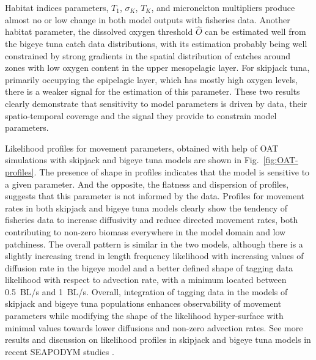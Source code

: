 Habitat indices parameters, $T_1$, $\sigma_K$, $T_K$, and micronekton multipliers produce almost no or low change in both model outputs with fisheries data. Another habitat parameter, the dissolved oxygen threshold $\hat{O}$ can be estimated well from the bigeye tuna catch data distributions, with its estimation probably being well constrained by strong gradients in the spatial distribution of catches around zones with low oxygen content in the upper mesopelagic layer. For skipjack tuna, primarily occupying the epipelagic layer, which has mostly high oxygen levels, there is a weaker signal for the estimation of this parameter. These two results clearly demonstrate that sensitivity to model parameters is driven by data, their spatio-temporal coverage and the signal they provide to constrain model parameters.

Likelihood profiles for movement parameters, obtained with help of OAT simulations with skipjack and bigeye tuna models are shown in Fig.~\ref{fig:OAT-profiles}. The presence of shape in profiles indicates that the model is sensitive to a given parameter. And the opposite, the flatness and dispersion of profiles, suggests that this parameter is not informed by the data. Profiles for movement rates in both skipjack and bigeye tuna models clearly show the tendency of fisheries data to increase diffusivity and reduce directed movement rates, both contributing to non-zero biomass everywhere in the model domain and low patchiness. The overall pattern is similar in the two models, although there is a slightly increasing trend in length frequency likelihood with increasing values of diffusion rate in the bigeye model and a better defined shape of tagging data likelihood with respect to advection rate, with a minimum located between 0.5~BL/s and 1~BL/s. Overall, integration of tagging data in the models of skipjack and bigeye tuna populations enhances observability of movement parameters while modifying the shape of the likelihood hyper-surface with minimal values towards lower diffusions and non-zero advection rates. See more results and discussion on likelihood profiles in skipjack and bigeye tuna models in recent SEAPODYM studies \citep{Senina20b, Senina2020c, Senina2021}.

